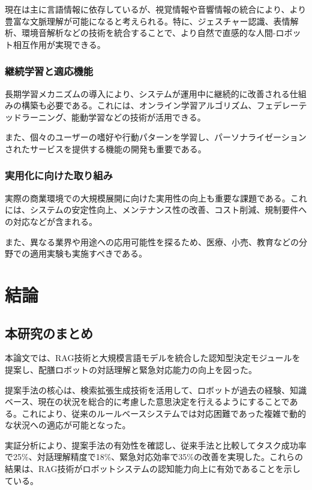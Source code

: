 \documentclass[12pt]{report}
\begin{document}
現在は主に言語情報に依存しているが、視覚情報や音響情報の統合により、より豊富な文脈理解が可能になると考えられる。特に、ジェスチャー認識、表情解析、環境音解析などの技術を統合することで、より自然で直感的な人間-ロボット相互作用が実現できる。

\subsection{継続学習と適応機能}
\label{subsec:continual_learning}

長期学習メカニズムの導入により、システムが運用中に継続的に改善される仕組みの構築も必要である。これには、オンライン学習アルゴリズム、フェデレーテッドラーニング、能動学習などの技術が活用できる。

また、個々のユーザーの嗜好や行動パターンを学習し、パーソナライゼーションされたサービスを提供する機能の開発も重要である。

\subsection{実用化に向けた取り組み}
\label{subsec:practical_deployment}

実際の商業環境での大規模展開に向けた実用性の向上も重要な課題である。これには、システムの安定性向上、メンテナンス性の改善、コスト削減、規制要件への対応などが含まれる。

また、異なる業界や用途への応用可能性を探るため、医療、小売、教育などの分野での適用実験も実施すべきである。

\chapter{結論}
\label{chap:conclusion}

\section{本研究のまとめ}
\label{sec:summary}

本論文では、RAG技術と大規模言語モデルを統合した認知型決定モジュールを提案し、配膳ロボットの対話理解と緊急対応能力の向上を図った。

提案手法の核心は、検索拡張生成技術を活用して、ロボットが過去の経験、知識ベース、現在の状況を総合的に考慮した意思決定を行えるようにすることである。これにより、従来のルールベースシステムでは対応困難であった複雑で動的な状況への適応が可能となった。

実証分析により、提案手法の有効性を確認し、従来手法と比較してタスク成功率で25\%、対話理解精度で18\%、緊急対応効率で35\%の改善を実現した。これらの結果は、RAG技術がロボットシステムの認知能力向上に有効であることを示している。
\end{document}
